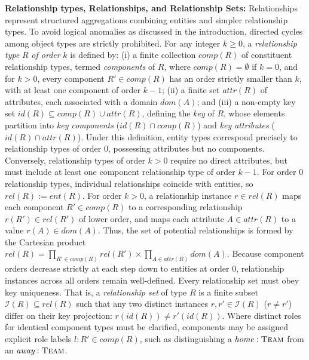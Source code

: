 \documentclass[sigconf]{acmart}
\begin{document}
\textbf{Relationship types, Relationships, and Relationship Sets:} Relationships represent structured aggregations combining entities and simpler relationship types. To avoid logical anomalies as discussed in the introduction, directed cycles among object types are strictly prohibited. For any integer $k \ge 0$, a \emph{relationship type} $R$ \emph{of order} $k$ is defined by: (i) a finite collection $\textit{comp}(R)$ of constituent relationship types, termed \emph{components} of $R$, where $\textit{comp}(R)=\emptyset$ if $k=0$, and for $k>0$, every component $R'\in\textit{comp}(R)$ has an order strictly smaller than $k$, with at least one component of order $k-1$; (ii) a finite set $\textit{attr}(R)$ of attributes, each associated with a domain $\textit{dom}(A)$; and (iii) a non-empty key set $\textit{id}(R)\subseteq\textit{comp}(R)\cup\textit{attr}(R)$, defining the \emph{key} of $R$, whose elements partition into \emph{key components} ($\textit{id}(R)\cap\textit{comp}(R)$) and \emph{key attributes} ($\textit{id}(R)\cap\textit{attr}(R)$). Under this definition, entity types correspond precisely to relationship types of order $0$, possessing attributes but no components. Conversely, relationship types of order $k>0$ require no direct attributes, but must include at least one component relationship type of order $k-1$. For order $0$ relationship types, individual relationships coincide with entities, so $\textit{rel}(R):=\textit{ent}(R)$. For order $k>0$, a relationship instance $r \in \textit{rel}(R)$ maps each component $R'\in\textit{comp}(R)$ to a corresponding relationship $r(R')\in\textit{rel}(R')$ of lower order, and maps each attribute $A\in\textit{attr}(R)$ to a value $r(A)\in\textit{dom}(A)$. Thus, the set of potential relationships is formed by the Cartesian product $\textit{rel}(R)=\prod_{R'\in\textit{comp}(R)}\textit{rel}(R')\times\prod_{A\in\textit{attr}(R)}\textit{dom}(A)$. Because component orders decrease strictly at each step down to entities at order $0$, relationship instances across all orders remain well-defined. Every relationship set must obey key uniqueness. That is, a \emph{relationship set} of type $R$ is a finite subset $\mathcal{I}(R)\subseteq\textit{rel}(R)$ such that any two distinct instances $r,r'\in\mathcal{I}(R)$ ($r\neq r'$) differ on their key projection: $r(\textit{id}(R))\neq r'(\textit{id}(R))$. Where distinct roles for identical component types must be clarified, components may be assigned explicit role labels $l:R'\in\textit{comp}(R)$, such as distinguishing a $\textit{home}:\textsc{Team}$ from an $\textit{away}:\textsc{Team}$.
\end{document}
